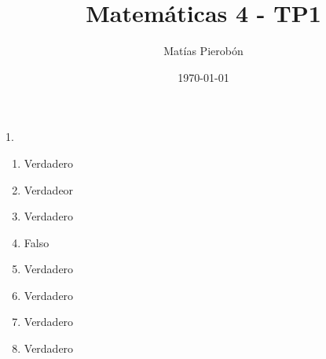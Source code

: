 \documentclass[11pt]{article}
\title{Matemáticas 4 - TP1}
\author{Matías Pierobón}
\date{\today}
\begin{document}
\maketitle

1. 

\begin{enumerate}
	\item Verdadero
	\item Verdadeor
	\item Verdadero 
	\item Falso
	\item Verdadero
	\item Verdadero
	\item Verdadero
	\item Verdadero
\end{enumerate}
\end{document}
